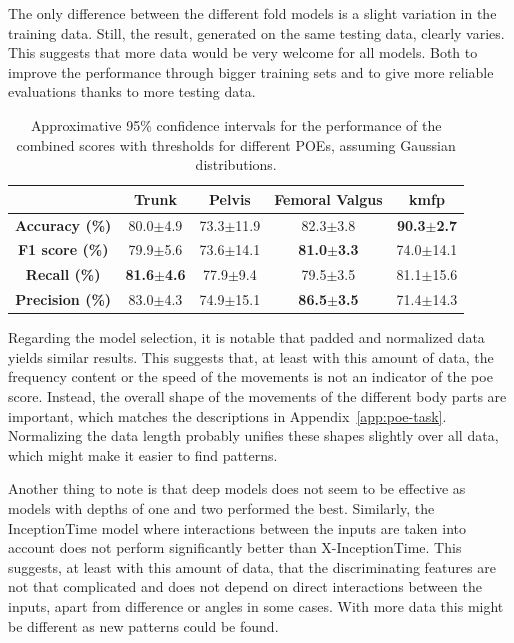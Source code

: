 The only difference between the different fold models is a slight variation in the training data. Still, the result, generated on the same testing data, clearly varies. This suggests that more data would be very welcome for all models. Both to improve the performance through bigger training sets and to give more reliable evaluations thanks to more testing data.

\begin{table}[h]
  \caption{Approximative 95\% confidence intervals for the performance of the combined scores with thresholds for different POEs, assuming Gaussian distributions. }
  \label{tab:sum-ci}
  \centering
  \begin{tabu}[c]{|c|c|c|c|c|}
    \hline
    & \textbf{Trunk} & \textbf{Pelvis} &\textbf{Femoral Valgus} & \textbf{\gls{kmfp}} \\ \hline
    \textbf{Accuracy (\%)}  & 80.0$\pm$4.9 & 73.3$\pm$11.9 & 82.3$\pm$3.8 & \textbf{90.3$\pm$2.7} \\\hline
    \textbf{F1 score (\%)}  & 79.9$\pm$5.6 & 73.6$\pm$14.1 & \textbf{81.0$\pm$3.3} & 74.0$\pm$14.1 \\ \hline
    \textbf{Recall (\%)}    & \textbf{81.6$\pm$4.6} & 77.9$\pm$9.4  & 79.5$\pm$3.5 & 81.1$\pm$15.6 \\ \hline
    \textbf{Precision (\%)} & 83.0$\pm$4.3 & 74.9$\pm$15.1 & \textbf{86.5$\pm$3.5} & 71.4$\pm$14.3 \\\hline
  \end{tabu}
\end{table}

Regarding the model selection, it is notable that padded and normalized data yields similar results. This suggests that, at least with this amount of data, the frequency content or the speed of the movements is not an indicator of the \gls{poe} score. Instead, the overall shape of the movements of the different body parts are important, which matches the descriptions in Appendix~\ref{app:poe-task}. Normalizing the data length probably unifies these shapes slightly over all data, which might make it easier to find patterns.

Another thing to note is that deep models does not seem to be effective as models with depths of one and two performed the best. Similarly, the InceptionTime model where interactions between the inputs are taken into account does not perform significantly better than X-InceptionTime. This suggests, at least with this amount of data, that the discriminating features are not that complicated and does not depend on direct interactions between the inputs, apart from difference or angles in some cases. With more data this might be different as new patterns could be found.
